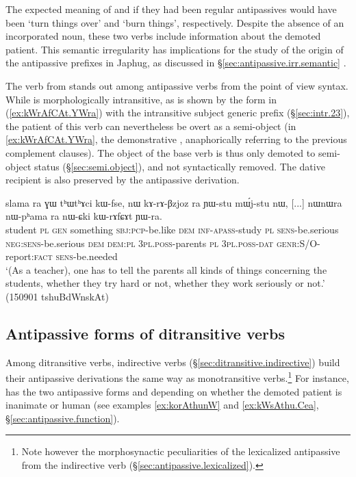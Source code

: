 The expected meaning of  and  if they had been regular antipassives would have been `turn things over' and `burn things', respectively. Despite the absence of an incorporated noun, these two verbs include information about the demoted patient. This semantic irregularity has implications for the study of the origin of the antipassive prefixes in Japhug, as discussed in §\ref{sec:antipassive.irr.semantic} .

 The verb  from  stands out among antipassive verbs from the point of view syntax. While  is morphologically intransitive, as is shown by the form  in (\ref{ex:kWrAfCAt.YWra}) with the intransitive subject generic prefix  (§\ref{sec:intr.23}), the patient of this verb can nevertheless be overt as a semi-object (in \ref{ex:kWrAfCAt.YWra}, the demonstrative , anaphorically referring to the previous complement clauses). The object of the base verb  is thus only demoted to semi-object status (§\ref{sec:semi.object}), and not syntactically removed. The dative recipient is also preserved by the antipassive derivation.

\begin{exe}
\ex \label{ex:kWrAfCAt.YWra}
\gll slama ra ɣɯ tʰɯtʰɤci kɯ-fse, nɯ kɤ-rɤ-βzjoz ra ɲɯ-stu mɯ́j-stu nɯ,
[...] nɯnɯra nɯ-pʰama ra nɯ-ɕki kɯ-rɤfɕɤt ɲɯ-ra. \\
student \textsc{pl} \textsc{gen} something \textsc{sbj}:\textsc{pcp}-be.like \textsc{dem} \textsc{inf}-\textsc{apass}-study \textsc{pl} \textsc{sens}-be.serious \textsc{neg}:\textsc{sens}-be.serious \textsc{dem} {  }  \textsc{dem}:\textsc{pl} \textsc{3pl}.\textsc{poss}-parents \textsc{pl} \textsc{3pl}.\textsc{poss}-\textsc{dat} \textsc{genr}:S/O-report:\textsc{fact} \textsc{sens}-be.needed \\
\glt `(As a teacher), one has to tell the parents all kinds of things concerning the students, whether they try hard or not, whether they work seriously or not.' (150901 tshuBdWnskAt)
\end{exe}

 
 \subsection{Antipassive forms of ditransitive verbs } \label{sec:antipassive.ditransitive}
 Among ditransitive verbs, indirective verbs (§\ref{sec:ditransitive.indirective}) build their antipassive derivations the same way as monotransitive verbs.\footnote{Note however the morphosynactic peculiarities of the lexicalized antipassive    from the indirective verb  (§\ref{sec:antipassive.lexicalized}). } For instance,   has the two antipassive forms  and  depending on whether the demoted patient is inanimate or human (see examples \ref{ex:korAthunW} and \ref{ex:kWsAthu.Cea}, §\ref{sec:antipassive.function}).


